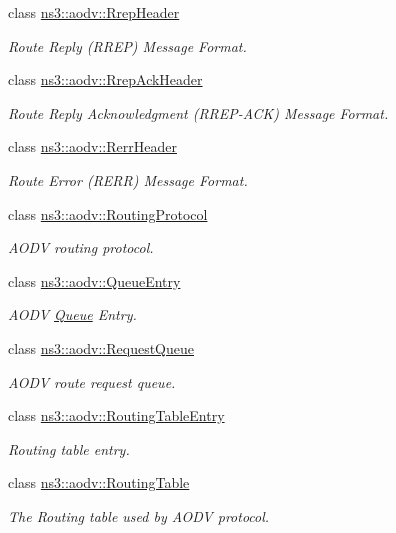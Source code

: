 \begin{DoxyCompactItemize}
class \hyperlink{classns3_1_1aodv_1_1RrepHeader}{ns3\+::aodv\+::\+Rrep\+Header}
\begin{DoxyCompactList}\small\item\em Route Reply (R\+R\+EP) Message Format. \end{DoxyCompactList}\item 
class \hyperlink{classns3_1_1aodv_1_1RrepAckHeader}{ns3\+::aodv\+::\+Rrep\+Ack\+Header}
\begin{DoxyCompactList}\small\item\em Route Reply Acknowledgment (R\+R\+E\+P-\/\+A\+CK) Message Format. \end{DoxyCompactList}\item 
class \hyperlink{classns3_1_1aodv_1_1RerrHeader}{ns3\+::aodv\+::\+Rerr\+Header}
\begin{DoxyCompactList}\small\item\em Route Error (R\+E\+RR) Message Format. \end{DoxyCompactList}\item 
class \hyperlink{classns3_1_1aodv_1_1RoutingProtocol}{ns3\+::aodv\+::\+Routing\+Protocol}
\begin{DoxyCompactList}\small\item\em A\+O\+DV routing protocol. \end{DoxyCompactList}\item 
class \hyperlink{classns3_1_1aodv_1_1QueueEntry}{ns3\+::aodv\+::\+Queue\+Entry}
\begin{DoxyCompactList}\small\item\em A\+O\+DV \hyperlink{classns3_1_1Queue}{Queue} Entry. \end{DoxyCompactList}\item 
class \hyperlink{classns3_1_1aodv_1_1RequestQueue}{ns3\+::aodv\+::\+Request\+Queue}
\begin{DoxyCompactList}\small\item\em A\+O\+DV route request queue. \end{DoxyCompactList}\item 
class \hyperlink{classns3_1_1aodv_1_1RoutingTableEntry}{ns3\+::aodv\+::\+Routing\+Table\+Entry}
\begin{DoxyCompactList}\small\item\em Routing table entry. \end{DoxyCompactList}\item 
class \hyperlink{classns3_1_1aodv_1_1RoutingTable}{ns3\+::aodv\+::\+Routing\+Table}
\begin{DoxyCompactList}\small\item\em The Routing table used by A\+O\+DV protocol. \end{DoxyCompactList}\item 

\end{DoxyCompactItemize}

